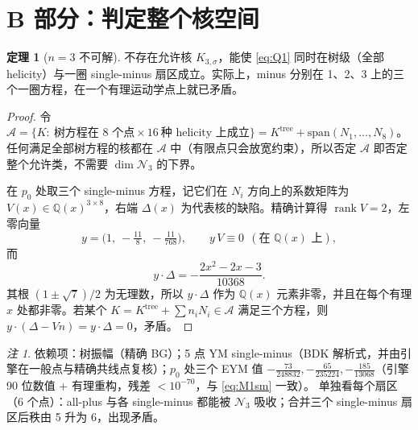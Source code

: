 \documentclass[11pt,a4paper]{ctexart}
\newcommand{\N}{\mathcal N}
\newcommand{\Q}{\mathbb Q}
\newcommand{\Ktree}{K^{\mathrm{tree}}}
\newcommand{\stat}[2]{\tcbox[on line,colback=#1!10,colframe=#1!70!black,boxrule=0.4pt,arc=1.5pt,
  left=2pt,right=2pt,top=0.6pt,bottom=0.6pt,boxsep=0pt,fontupper=\small\bfseries\color{#1!70!black}]{#2}}
\newcommand{\CAProved}{\stat{ForestGreen}{已证明（计算机辅助）}}
\theoremstyle{definition}
\newtheorem{theorem}{定理}
\theoremstyle{remark}
\newtheorem*{remark}{注}
\begin{document}
\section{B 部分：判定整个核空间}
\begin{theorem}[$n=3$ 不可解]\label{thm:n3}
不存在允许核 $K_{3,\sigma}$，能使 \eqref{eq:Q1} 同时在树级（全部 helicity）与一圈 single-minus 扇区成立。实际上，minus 分别在 1、2、3 上的三个一圈方程，在一个有理运动学点上就已矛盾。\hfill\CAProved
\end{theorem}
\begin{proof}
令 $\mathcal A=\{K:\ \text{树方程在 8 个点}\times16\ \text{种 helicity 上成立}\}=\Ktree+\mathrm{span}(N_1,\dots,N_8)$。任何满足全部树方程的核都在 $\mathcal A$ 中（有限点只会放宽约束），所以否定 $\mathcal A$ 即否定整个允许类，不需要 $\dim\N_3$ 的下界。

在 $p_0$ 处取三个 single-minus 方程，记它们在 $N_i$ 方向上的系数矩阵为 $V(x)\in\Q(x)^{3\times8}$，右端 $\Delta(x)$ 为代表核的缺陷。精确计算得 $\operatorname{rank}V=2$，左零向量
\[
y=\Big(1,\ -\tfrac{11}{8},\ -\tfrac{11}{768}\Big),\qquad y\,V\equiv0\ \ (\text{在 }\Q(x)\text{ 上}),
\]
而
\[
y\cdot\Delta=-\frac{2x^2-2x-3}{10368}.
\]
其根 $(1\pm\sqrt7)/2$ 为无理数，所以 $y\cdot\Delta$ 作为 $\Q(x)$ 元素非零，并且在每个有理 $x$ 处都非零。若某个 $K=\Ktree+\sum n_iN_i\in\mathcal A$ 满足三个方程，则 $y\cdot(\Delta-Vn)=y\cdot\Delta=0$，矛盾。
\end{proof}
\begin{remark}
依赖项：树振幅（精确 BG）；5 点 YM single-minus（BDK 解析式，并由引擎在一般点与精确共线点复核）；$p_0$ 处三个 EYM 值 $-\frac{73}{248832},-\frac{65}{235224},-\frac{185}{13068}$（引擎 90 位数值 + 有理重构，残差 $<10^{-70}$，与 \eqref{eq:M1sm} 一致）。
单独看每个扇区（6 个点）：all-plus 与各 single-minus 都能被 $\N_3$ 吸收；合并三个 single-minus 扇区后秩由 5 升为 6，出现矛盾。
\end{remark}
\end{document}
